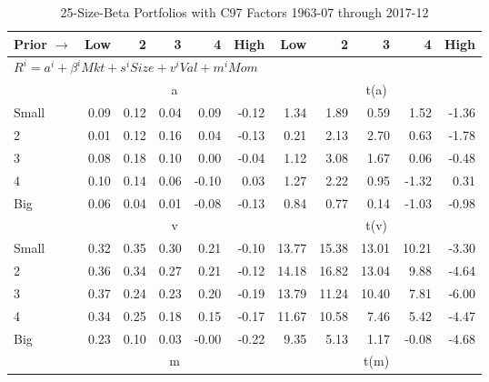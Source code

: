 
\begin{table}[!ht]
\footnotesize
\centering
\caption{25-Size-Beta Portfolios with C97 Factors 1963-07 through 2017-12}
\begin{tabular}{lrrrrrrrrrr}
  \toprule
    Prior $\rightarrow$ & Low & 2 & 3 & 4 & High & Low & 2 & 3 & 4 & High \\ 
  \midrule
  \multicolumn{11}{l}{$R^i=a^i+\beta^iMkt+s^iSize+v^iVal+m^iMom$} \\

  
    
      & \multicolumn{5}{c}{a} & \multicolumn{5}{c}{t(a)}
    
    \\
      \cmidrule(r){2-6} \cmidrule(r){7-11}

    Small   & 0.09  & 0.12  & 0.04  & 0.09  & -0.12  & 1.34  & 1.89  & 0.59  & 1.52  & -1.36  \\
         2  & 0.01  & 0.12  & 0.16  & 0.04  & -0.13  & 0.21  & 2.13  & 2.70  & 0.63  & -1.78  \\
         3  & 0.08  & 0.18  & 0.10  & 0.00  & -0.04  & 1.12  & 3.08  & 1.67  & 0.06  & -0.48  \\
         4  & 0.10  & 0.14  & 0.06  & -0.10  & 0.03  & 1.27  & 2.22  & 0.95  & -1.32  & 0.31  \\
    Big     & 0.06  & 0.04  & 0.01  & -0.08  & -0.13  & 0.84  & 0.77  & 0.14  & -1.03  & -0.98  \\

  
    
      & \multicolumn{5}{c}{v} & \multicolumn{5}{c}{t(v)}
    
    \\
      \cmidrule(r){2-6} \cmidrule(r){7-11}

    Small   & 0.32  & 0.35  & 0.30  & 0.21  & -0.10  & 13.77  & 15.38  & 13.01  & 10.21  & -3.30  \\
         2  & 0.36  & 0.34  & 0.27  & 0.21  & -0.12  & 14.18  & 16.82  & 13.04  & 9.88  & -4.64  \\
         3  & 0.37  & 0.24  & 0.23  & 0.20  & -0.19  & 13.79  & 11.24  & 10.40  & 7.81  & -6.00  \\
         4  & 0.34  & 0.25  & 0.18  & 0.15  & -0.17  & 11.67  & 10.58  & 7.46  & 5.42  & -4.47  \\
    Big     & 0.23  & 0.10  & 0.03  & -0.00  & -0.22  & 9.35  & 5.13  & 1.17  & -0.08  & -4.68  \\

  
    
      & \multicolumn{5}{c}{m} & \multicolumn{5}{c}{t(m)}
    

\end{tabular}
\end{table}
